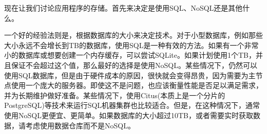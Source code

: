 现在让我们讨论应用程序的存储。首先来决定是使用SQL、NoSQL还是其他什么。

一个好的经验法则是，根据数据库的大小来决定技术。对于小型数据库，例如那些大小永远不会增长到TB的数据库，使用SQL是一种有效的方法。如果有一个非常小的数据库或想要创建一个内存缓存，可以尝试SQLite。如果计划使用1个TB，并且保证不会超过这个值，那么最好的选择是使用NoSQL。某些情况下，仍然可以使用SQL数据库，但是由于硬件成本的原因，很快就会变得昂贵，因为需要为主节点使用一个庞大的服务器。即使这不是问题，也应该衡量性能是否足以满足需求，并为长期维护做好准备。某些情况下，使用Citus(本质上是一个分片的PostgreSQL)等技术来运行SQL机器集群也比较适合。但是，在这种情况下，通常使用NoSQL更便宜、更简单。如果数据库的大小超过10TB，或者需要实时获取数据，请考虑使用数据仓库而不是NoSQL。